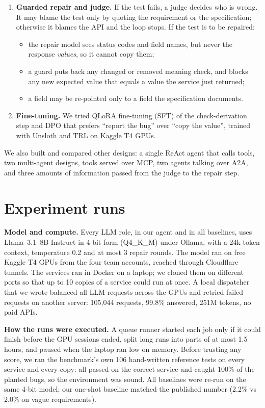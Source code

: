 \documentclass[11pt,a4paper]{article}
\begin{document}
\begin{enumerate}[label=(\arabic*)]
\item \textbf{Guarded repair and judge.} If the test fails, a judge decides who is wrong. It may blame the test only by quoting the requirement or the specification; otherwise it blames the API and the loop stops. If the test is to be repaired:
  \begin{itemize}
  \item the repair model sees status codes and field names, but never the response \emph{values}, so it cannot copy them;
  \item a guard puts back any changed or removed meaning check, and blocks any new expected value that equals a value the service just returned;
  \item a field may be re-pointed only to a field the specification documents.
  \end{itemize}
\item \textbf{Fine-tuning.} We tried QLoRA fine-tuning (SFT) of the check-derivation step and DPO that prefers ``report the bug'' over ``copy the value'', trained with Unsloth and TRL on Kaggle T4 GPUs.
\end{enumerate}
We also built and compared other designs: a single ReAct agent that calls tools, two multi-agent designs, tools served over MCP, two agents talking over A2A, and three amounts of information passed from the judge to the repair step.

\section{Experiment runs}
\textbf{Model and compute.} Every LLM role, in our agent and in all baselines, uses Llama~3.1~8B Instruct in 4-bit form (Q4\_K\_M) under Ollama, with a 24k-token context, temperature 0.2 and at most 3 repair rounds. The model ran on free Kaggle T4 GPUs from the four team accounts, reached through Cloudflare tunnels. The services ran in Docker on a laptop; we cloned them on different ports so that up to 10 copies of a service could run at once. A local dispatcher that we wrote balanced all LLM requests across the GPUs and retried failed requests on another server: 105{,}044 requests, 99.8\% answered, 251M tokens, no paid APIs.

\textbf{How the runs were executed.} A queue runner started each job only if it could finish before the GPU sessions ended, split long runs into parts of at most 1.5 hours, and paused when the laptop ran low on memory. Before trusting any score, we ran the benchmark's own 106 hand-written reference tests on every service and every copy: all passed on the correct service and caught 100\% of the planted bugs, so the environment was sound. All baselines were re-run on the same 4-bit model; our one-shot baseline matched the published number (2.2\% vs 2.0\% on vague requirements).
\end{document}
